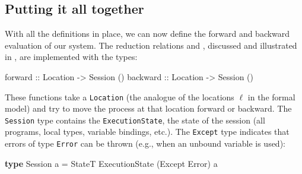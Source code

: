 \documentclass[runningheads,plain]{llncs}
\newenvironment{Shaded}{}{}
\newcommand{\KeywordTok}[1]{\textcolor[rgb]{0.00,0.44,0.13}{\textbf{#1}}}
\newcommand{\DataTypeTok}[1]{\textcolor[rgb]{0.56,0.13,0.00}{#1}}
\newcommand{\OtherTok}[1]{\textcolor[rgb]{0.00,0.44,0.13}{#1}}
\newcommand{\FunctionTok}[1]{\textcolor[rgb]{0.02,0.16,0.49}{#1}}
\newcommand{\NormalTok}[1]{#1}
\begin{document}
\subsection{Putting it all together}\label{combining}
With all the definitions in place, we can now define the forward and backward
evaluation of our system. 
The reduction relations \fw and \bk, discussed and illustrated in , are implemented with the types:
\begin{Shaded}
\begin{Highlighting}[]
\OtherTok{forward  ::} \DataTypeTok{Location} \OtherTok{->} \DataTypeTok{Session}\NormalTok{ ()}
\OtherTok{backward ::} \DataTypeTok{Location} \OtherTok{->} \DataTypeTok{Session}\NormalTok{ ()}
\end{Highlighting}
\end{Shaded}

These functions take a \texttt{Location} (the analogue of the locations $\ell$ in the formal model) and try to move the process at that location
forward or backward. The \texttt{Session} type contains the
\texttt{ExecutionState}, the state of the session (all programs, local
types, variable bindings, etc.). The \texttt{Except} type indicates that errors of type \texttt{Error} can be thrown (e.g., when an unbound variable is used):

\begin{Shaded}
\begin{Highlighting}[]
\KeywordTok{type} \DataTypeTok{Session}\NormalTok{ a }\FunctionTok{=} \DataTypeTok{StateT} \DataTypeTok{ExecutionState}\NormalTok{ (}\DataTypeTok{Except} \DataTypeTok{Error}\NormalTok{) a}
\end{Highlighting}
\end{Shaded}
\end{document}
